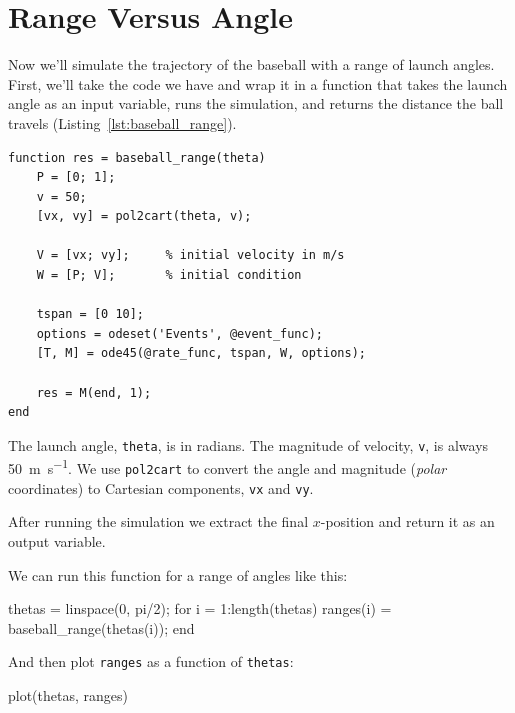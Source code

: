 

\section{Range Versus Angle}

Now we'll simulate the trajectory of the baseball with a range of launch angles.  First, we'll take the code we have and wrap it in a function that takes the launch angle as an input variable, runs the simulation, and returns the distance the ball travels (Listing~\ref{lst:baseball_range}).


\begin{lstlisting}[caption={A function that takes the launch angle of a baseball and returns the distance it travels}, label={lst:baseball_range}]
function res = baseball_range(theta)
    P = [0; 1];       
    v = 50;           
    [vx, vy] = pol2cart(theta, v);
    
    V = [vx; vy];     % initial velocity in m/s
    W = [P; V];       % initial condition
    
    tspan = [0 10];
    options = odeset('Events', @event_func);
    [T, M] = ode45(@rate_func, tspan, W, options);
    
    res = M(end, 1);
end
\end{lstlisting}

The launch angle, \lstinline{theta}, is in radians.  The magnitude of velocity, \lstinline{v}, is always \SI{50}{\meter\per\second}.  We use \lstinline{pol2cart} to convert the angle and magnitude (\emph{polar} coordinates) to Cartesian components, \lstinline{vx} and \lstinline{vy}.


After running the simulation we extract the final $x$-position and return it as an output variable.  

We can run this function for a range of angles like this:

\begin{code}
    thetas = linspace(0, pi/2);
    for i = 1:length(thetas)
        ranges(i) = baseball_range(thetas(i));
    end
\end{code}
And then plot \lstinline{ranges} as a function of \lstinline{thetas}:

\begin{code}
    plot(thetas, ranges)
\end{code}

